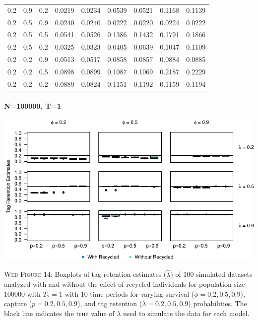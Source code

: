 \documentclass[]{article}
\let\oldparagraph\paragraph
\renewcommand{\paragraph}[1]{\oldparagraph{#1}\mbox{}}
\begin{document}
\begin{table}[ht]
{\begin{tabular}{rrrrrrrrr}
  0.2 & 0.9 & 0.2 & 0.0219 & 0.0234 & 0.0539 & 0.0521 & 0.1168 & 0.1139 \\ 
  0.2 & 0.5 & 0.9 & 0.0240 & 0.0240 & 0.0222 & 0.0220 & 0.0224 & 0.0222 \\ 
  0.2 & 0.5 & 0.5 & 0.0541 & 0.0526 & 0.1386 & 0.1432 & 0.1791 & 0.1866 \\ 
  0.2 & 0.5 & 0.2 & 0.0325 & 0.0323 & 0.0405 & 0.0639 & 0.1047 & 0.1109 \\ 
  0.2 & 0.2 & 0.9 & 0.0513 & 0.0517 & 0.0858 & 0.0857 & 0.0884 & 0.0885 \\ 
  0.2 & 0.2 & 0.5 & 0.0898 & 0.0899 & 0.1087 & 0.1069 & 0.2187 & 0.2229 \\ 
  0.2 & 0.2 & 0.2 & 0.0889 & 0.0824 & 0.1151 & 0.1192 & 0.1159 & 0.1194 \\ 
   \hline
\end{tabular}
}
\endgroup
\end{table}

\newpage

\paragraph{N=100000, T=1}\label{n100000-t1-2}

\includegraphics{Appendix_files/figure-latex/figure14_tagretention_GJSTL2-1.pdf}

\textsc{Web Figure 14:} Boxplots of tag retention estimates
(\(\hat{\lambda}\)) of 100 simulated datasets analyzed with and without
the effect of recycled individuals for population size \(100000\) with
\(T_2=1\) with 10 time periods for varying survival
(\(\phi=0.2,0.5,0.9\)), capture (\(p=0.2,0.5,0.9\)), and tag retention
(\(\lambda=0.2,0.5,0.9\)) probabilities. The black line indicates the
true value of \(\lambda\) used to simulate the data for each model.
\end{document}
